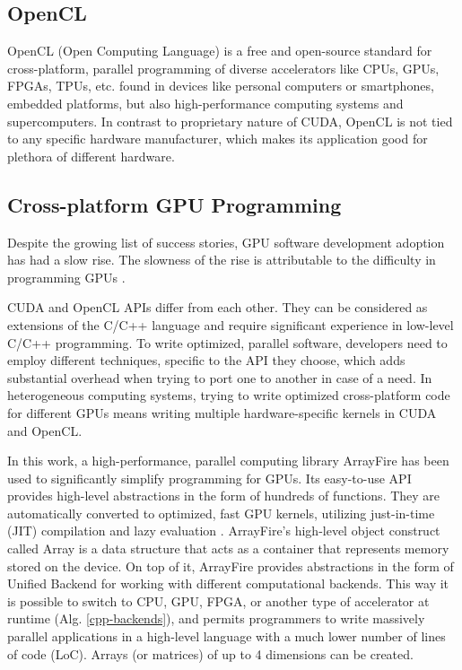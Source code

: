 \subsection{OpenCL}
OpenCL (Open Computing Language) is a free and open-source standard for cross-platform, parallel programming of diverse accelerators like CPUs, GPUs, FPGAs, TPUs, etc. found in devices like personal computers or smartphones, embedded platforms, but also high-performance computing systems and supercomputers. In contrast to proprietary nature of CUDA, OpenCL is not tied to any specific hardware manufacturer, which makes its application good for plethora of different hardware.

\subsection{Cross-platform GPU Programming}
\label{sec:computer-simulations-using-gpus}

Despite the growing list of success stories, GPU software development adoption has had a slow rise. The slowness of the rise is attributable to the difficulty in programming GPUs \citep{malcolmArrayFireGPUAcceleration2012a}.

\citep{karimiPerformanceComparisonCUDAa}

CUDA and OpenCL APIs differ from each other. They can be considered as extensions of the C/C++ language and require significant experience in low-level C/C++ programming. To write optimized, parallel software, developers need to employ different techniques, specific to the API they choose, which adds substantial overhead when trying to port one to another in case of a need. In heterogeneous computing systems, trying to write optimized cross-platform code for different GPUs means writing multiple hardware-specific kernels in CUDA and OpenCL.

In this work, a high-performance, parallel computing library ArrayFire has been used to significantly simplify programming for GPUs. Its easy-to-use API provides high-level abstractions in the form of hundreds of functions. They are automatically converted to optimized, fast GPU kernels, utilizing just-in-time (JIT) compilation and lazy evaluation \cite{chrzeszczykMatrixComputationsGPUb}. ArrayFire's high-level object construct called Array is a data structure that acts as a container that represents memory stored on the device. On top of it, ArrayFire provides abstractions in the form of Unified Backend for working with different computational backends. This way it is possible to switch to CPU, GPU, FPGA, or another type of accelerator at runtime \cite{Yalamanchili2015} (Alg. \ref{cpp-backends}), and permits programmers to write massively parallel applications in a high-level language with a much lower number of lines of code (LoC). Arrays (or matrices) of up to 4 dimensions can be created. 


